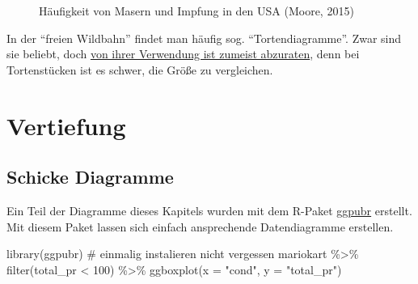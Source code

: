 \documentclass[
  letterpaper,
  twoside,
  open=any]{scrbook}
\newenvironment{Shaded}{\begin{snugshade}}{\end{snugshade}}
\newcommand{\AttributeTok}[1]{\textcolor[rgb]{0.40,0.45,0.13}{#1}}
\newcommand{\CommentTok}[1]{\textcolor[rgb]{0.37,0.37,0.37}{#1}}
\newcommand{\DecValTok}[1]{\textcolor[rgb]{0.68,0.00,0.00}{#1}}
\newcommand{\FunctionTok}[1]{\textcolor[rgb]{0.28,0.35,0.67}{#1}}
\newcommand{\NormalTok}[1]{\textcolor[rgb]{0.00,0.23,0.31}{#1}}
\newcommand{\SpecialCharTok}[1]{\textcolor[rgb]{0.37,0.37,0.37}{#1}}
\newcommand{\StringTok}[1]{\textcolor[rgb]{0.13,0.47,0.30}{#1}}
\theoremstyle{definition}
\theoremstyle{definition}
\theoremstyle{definition}
\theoremstyle{remark}
\begin{document}
\begin{figure}


\caption{\label{fig-vaccine}Häufigkeit von Masern und Impfung in den USA
(Moore, 2015)}

\end{figure}%

In der \enquote{freien Wildbahn} findet man häufig sog.
\enquote{Tortendiagramme}. Zwar sind sie beliebt, doch
\href{https://www.data-to-viz.com/caveat/pie.html}{von ihrer Verwendung
ist zumeist abzuraten}, denn bei Tortenstücken ist es schwer, die Größe
zu vergleichen.

\section{Vertiefung}\label{vertiefung-3}

\subsection{Schicke Diagramme}\label{schicke-diagramme}

Ein Teil der Diagramme dieses Kapitels wurden mit dem R-Paket
\href{https://rpkgs.datanovia.com/ggpubr/}{ggpubr} erstellt. Mit diesem
Paket lassen sich einfach ansprechende Datendiagramme erstellen.

\begin{Shaded}
\begin{Highlighting}[]
\FunctionTok{library}\NormalTok{(ggpubr)  }\CommentTok{\# einmalig instalieren nicht vergessen}
\NormalTok{mariokart }\SpecialCharTok{\%\textgreater{}\%} 
  \FunctionTok{filter}\NormalTok{(total\_pr }\SpecialCharTok{\textless{}} \DecValTok{100}\NormalTok{) }\SpecialCharTok{\%\textgreater{}\%} 
  \FunctionTok{ggboxplot}\NormalTok{(}\AttributeTok{x =} \StringTok{"cond"}\NormalTok{, }\AttributeTok{y =} \StringTok{"total\_pr"}\NormalTok{)}
\end{Highlighting}
\end{Shaded}
\end{document}
